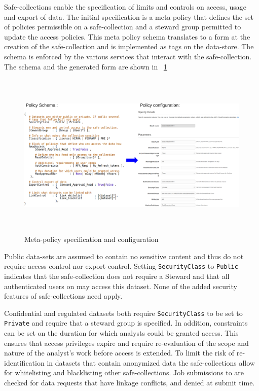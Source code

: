 Safe-collections enable the specification of limits and controls on access, usage and export of data.
The initial specification is a meta policy that defines the set of policies permissible on a safe-collection and
a steward group permitted to update the access policies. This meta policy schema translates to a form
at the creation of the safe-collection and is implemented as tags on the data-store. The schema is enforced
by the various services that interact with the safe-collection. The schema and the generated form are shown in
\figurename~\ref{fig:schema}

\begin{figure}[ht]
  \center
  \includegraphics[width=\textwidth, height=8cm]{figures/meta-policy.png}
  \caption{Meta-policy specification and configuration}
  \vspace{-1.5em}
  \label{fig:schema}
\end{figure}

Public data-sets are assumed to contain no sensitive content and thus do not require access control nor
export control. Setting \texttt{SecurityClass} to \texttt{Public} indicates that the safe-collection does
not require a Steward and that all authenticated users on \NAME may access this dataset. None of the added
security features of safe-collections need apply.

Confidential and regulated datasets both require \texttt{SecurityClass} to be set to \texttt{Private}
and require that a steward group is specified. In addition, constraints can be set on the duration
for which analysts could be granted access. This ensures that access privileges expire and require
re-evaluation of the scope and nature of the analyst's work before access is extended. To limit the risk of
re-identification in datasets that contain anonymized data the safe-collections allow for whitelisting and
blacklisting other safe-collections. Job submissions to \NAME are checked for data requests that have
linkage conflicts, and denied at submit time.

